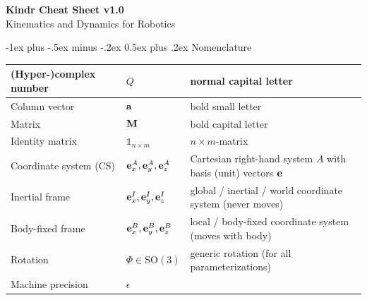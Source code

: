 \documentclass[10pt,landscape,a4paper]{article}
\makeatletter
\renewcommand{\section}{\@startsection{section}{1}{0mm}%
                               {-1ex plus -.5ex minus -.2ex}%
                                {0.5ex plus .2ex}%
                                {\normalfont\large\bfseries}}
\newcommand\identity{\mathds{1}}
\newcommand\linvel[2]{{}_#1\vv_{#2}}
\newcommand\rotvel[3]{{}_#1\vom_{#2\!#3}}
\makeatother
\begin{document}
\raggedright
\footnotesize
\begin{multicols}{2}


\setlength{\premulticols}{1pt}
\setlength{\postmulticols}{1pt}
\setlength{\multicolsep}{1pt}
\setlength{\columnsep}{2pt}

\begin{center}
     \Large{\textbf{Kindr Cheat Sheet v1.0}} \\
      \small{Kinematics and Dynamics for Robotics}
\end{center}
\section{Nomenclature}
\begin{tabular}{ll@{   }l}
\hline
(Hyper-)complex number & $Q$ & normal capital letter  \\ \hline
Column vector & $\mathbf a$ & bold small letter  \\ \hline
Matrix & $\mathbf M$ & bold capital letter  \\ \hline
Identity matrix & $\identity_{n\times m}$ & ${n \times m}$-matrix  \\  \hline
Coordinate system (CS) & ${\mathbf e_x^A,\mathbf e_y^A,\mathbf e_z^A}$ & Cartesian right-hand system $A$ with basis (unit) vectors $\mathbf e$  \\ \hline
Inertial frame & ${\mathbf e_x^I,\mathbf e_y^I,\mathbf e_z^I}$ & global / inertial / world coordinate system (never moves) \\ \hline
Body-fixed frame & ${\mathbf e_x^B,\mathbf e_y^B,\mathbf e_z^B}$ & local / body-fixed coordinate system (moves with body) \\ \hline
Rotation & $\Phi \in \mathrm{SO}(3)$ & generic rotation (for all parameterizations) \\ \hline
Machine precision & $\epsilon$ & \\ \hline


\end{tabular}
\end{multicols}
\end{document}
